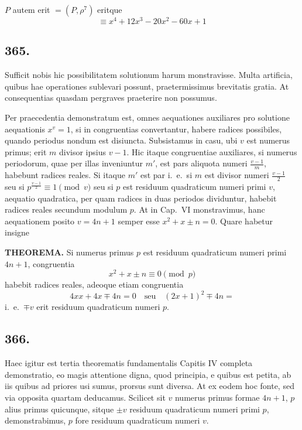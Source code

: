 \documentclass[12pt]{article}
\begin{document}
$P$ autem erit $=(P,\rho^7)$ eritque
\[
\equiv x^4+12x^3-20x^2-60x+1
\]

\subsection*{365.}

Sufficit nobis hic possibilitatem solutionum harum monstravisse. Multa artificia, quibus hae operationes sublevari possunt, praetermissimus brevitatis gratia. At consequentias quasdam pergraves praeterire non possumus.

Per praecedentia demonstratum est, omnes aequationes auxiliares pro solutione aequationis $x^v=1$, si in congruentias convertantur, habere radices possibiles, quando periodus nondum est disiuncta. Subsistamus in casu, ubi $v$ est numerus primus; erit $m$ divisor ipsius $v-1$. Hic itaque congruentiae auxiliares, si numerus periodorum, quae per illas inveniuntur $m'$, est pars aliquota numeri $\frac{v-1}{m}$, habebunt radices reales. Si itaque $m'$ est par i.~e.~si $m$ est divisor numeri $\frac{v-1}{2}$ seu si $p^{\frac{v-1}{2}}\equiv 1\pmod{v}$ seu si $p$ est residuum quadraticum numeri primi $v$, aequatio quadratica, per quam radices in duas periodos dividuntur, habebit radices reales secundum modulum $p$. At in Cap.~VI monstravimus, hanc aequationem posito $v=4n+1$ semper esse $x^2+x\pm n=0$. Quare habetur insigne

\textbf{THEOREMA.} Si numerus primus $p$ est residuum quadraticum numeri primi $4n+1$, congruentia
\[
x^2+x\pm n\equiv 0 \pmod{p}
\]
habebit radices reales, adeoque etiam congruentia
\[
4xx+4x\mp 4n=0 \quad \text{seu} \quad (2x+1)^2 \mp 4n=
\]
i.~e.~$\mp v$ erit residuum quadraticum numeri $p$.

\subsection*{366.}

Haec igitur est tertia theorematis fundamentalis Capitis IV completa demonstratio, eo magis attentione digna, quod principia, e quibus est petita, ab iis quibus ad priores usi sumus, prorsus sunt diversa. At ex eodem hoc fonte, sed via opposita quartam deducamus. Scilicet sit $v$ numerus primus formae $4n+1$, $p$ alius primus quicunque, sitque $\pm v$ residuum quadraticum numeri primi $p$, demonstrabimus, $p$ fore residuum quadraticum numeri $v$.
\end{document}
